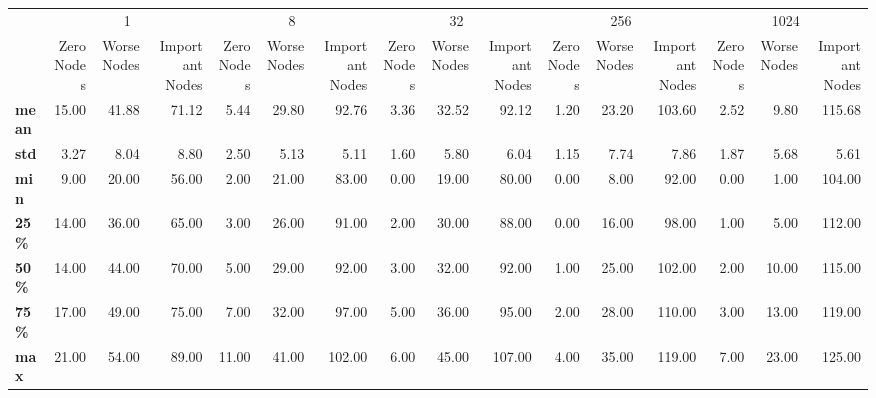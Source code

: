 \begin{tabular}{lrrrrrrrrrrrrrrr}
\toprule
{} & \multicolumn{3}{c}{1} & \multicolumn{3}{c}{8} & \multicolumn{3}{c}{32} & \multicolumn{3}{c}{256} & \multicolumn{3}{c}{1024} \\
{} & Zero Nodes & Worse Nodes & Important Nodes & Zero Nodes & Worse Nodes & Important Nodes & Zero Nodes & Worse Nodes & Important Nodes & Zero Nodes & Worse Nodes & Important Nodes & Zero Nodes & Worse Nodes & Important Nodes \\
\midrule
\textbf{mean} &      15.00 &       41.88 &           71.12 &       5.44 &       29.80 &           92.76 &       3.36 &       32.52 &           92.12 &       1.20 &       23.20 &          103.60 &       2.52 &        9.80 &          115.68 \\
\textbf{std } &       3.27 &        8.04 &            8.80 &       2.50 &        5.13 &            5.11 &       1.60 &        5.80 &            6.04 &       1.15 &        7.74 &            7.86 &       1.87 &        5.68 &            5.61 \\
\textbf{min } &       9.00 &       20.00 &           56.00 &       2.00 &       21.00 &           83.00 &       0.00 &       19.00 &           80.00 &       0.00 &        8.00 &           92.00 &       0.00 &        1.00 &          104.00 \\
\textbf{25\% } &      14.00 &       36.00 &           65.00 &       3.00 &       26.00 &           91.00 &       2.00 &       30.00 &           88.00 &       0.00 &       16.00 &           98.00 &       1.00 &        5.00 &          112.00 \\
\textbf{50\% } &      14.00 &       44.00 &           70.00 &       5.00 &       29.00 &           92.00 &       3.00 &       32.00 &           92.00 &       1.00 &       25.00 &          102.00 &       2.00 &       10.00 &          115.00 \\
\textbf{75\% } &      17.00 &       49.00 &           75.00 &       7.00 &       32.00 &           97.00 &       5.00 &       36.00 &           95.00 &       2.00 &       28.00 &          110.00 &       3.00 &       13.00 &          119.00 \\
\textbf{max } &      21.00 &       54.00 &           89.00 &      11.00 &       41.00 &          102.00 &       6.00 &       45.00 &          107.00 &       4.00 &       35.00 &          119.00 &       7.00 &       23.00 &          125.00 \\
\bottomrule
\end{tabular}
